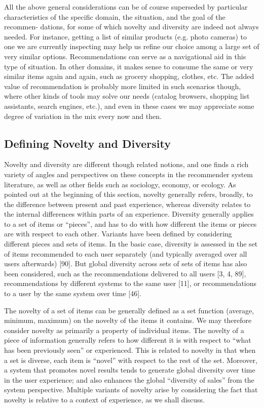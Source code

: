 All the above general considerations can be of course superseded by particular characteristics of the specific domain, the situation, and the goal of the recommen- dations, for some of which novelty and diversity are indeed not always needed. For instance, getting a list of similar products (e.g. photo cameras) to one we are currently inspecting may help us refine our choice among a large set of very similar options. Recommendations can serve as a navigational aid in this type of situation. In other domains, it makes sense to consume the same or very similar items again and again, such as grocery shopping, clothes, etc. The added value of recommendation is probably more limited in such scenarios though, where other kinds of tools may solve our needs (catalog browsers, shopping list assistants, search engines, etc.), and even in these cases we may appreciate some degree of variation in the mix every now and then.

\subsection{Defining Novelty and Diversity}

Novelty and diversity are different though related notions, and one finds a rich variety of angles and perspectives on these concepts in the recommender system literature, as well as other fields such as sociology, economy, or ecology. As pointed out at the beginning of this section, novelty generally refers, broadly, to the difference between present and past experience, whereas diversity relates to the internal differences within parts of an experience. Diversity generally applies to a set of items or “pieces”, and has to do with how different the items or pieces are with respect to each other. Variants have been defined by considering different pieces and sets of items. In the basic case, diversity is assessed in the set of items recommended to each user separately (and typically averaged over all users afterwards) [90]. But global diversity across sets of sets of items has also been considered, such as the recommendations delivered to all users [3, 4, 89], recommendations by different systems to the same user [11], or recommendations to a user by the same system over time [46].

The novelty of a set of items can be generally defined as a set function (average, minimum, maximum) on the novelty of the items it contains. We may therefore consider novelty as primarily a property of individual items. The novelty of a piece of information generally refers to how different it is with respect to “what has been previously seen” or experienced. This is related to novelty in that when a set is diverse, each item is “novel” with respect to the rest of the set. Moreover, a system that promotes novel results tends to generate global diversity over time in the user experience; and also enhances the global “diversity of sales” from the system perspective. Multiple variants of novelty arise by considering the fact that novelty is relative to a context of experience, as we shall discuss.

